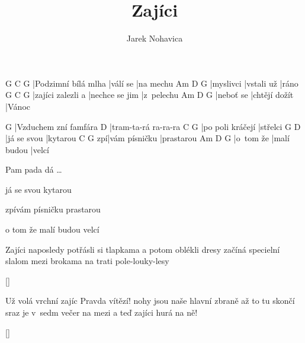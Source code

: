 \documentclass{song}
\author{Jarek Nohavica}
\title{Zajíci}
\begin{document}
\strophe
G                   C        G
|Podzimní bílá mlha |válí se |na mechu
Am        D          G
|myslivci |vstali už |ráno
G                 C              G
|zajíci zalezli a |nechce se jim |z~pelechu
Am        D             G
|neboť se |chtějí dožít |Vánoc
\endstrophe

G
|Vzduchem zní famfára
D
|tram-ta-rá ra-ra-ra
C                G
|po poli kráčejí |střelci
G           D
|já se svou |kytarou
   C             G
zpí|vám písničku |prastarou
Am        D           G
|o~tom že |malí budou |velcí

Pam pada dá \ldots{}

já se svou kytarou

zpívám písničku prastarou

o tom že malí budou velcí
\endstrophe

\strophe*
Zajíci naposledy potřásli si tlapkama
a potom oblékli dresy
začíná specielní slalom mezi brokama
na trati pole-louky-lesy
\endstrophe

\ref{}

\strophe*
Už volá vrchní zajíc Pravda vítězí!
nohy jsou naše hlavní zbraně
až to tu skončí sraz je v~sedm večer na mezi
a teď zajíci hurá na ně!
\endstrophe

\ref{}
\end{document}
